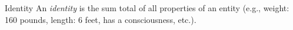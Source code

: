 \begin{definition}{Identity} An \emph{identity} is the sum total of all properties of an entity (e.g., weight: 160 pounds, length: 6 feet, has a consciousness, etc.).\end{definition}
